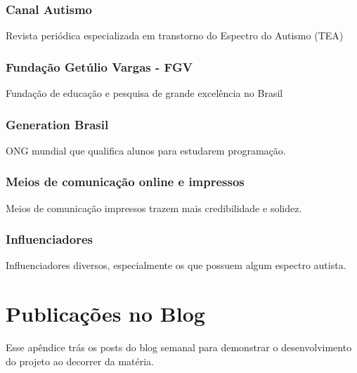 \documentclass[
    12pt,               %
    openright,          %
    oneside,
    a4paper,            %
    paginasA3,  %
    BIBLATEX,           %
    REFINDENT,          %
    MODELO,             %
    TODO,               %
    english,            %
    brazil              %
    ]{ifsp-spo-inf-ctds} %
\providecommand{\DIFaddbegin}{} %
\providecommand{\DIFaddend}{} %
\begin{document}
\begin{apendicesenv}
\subsection{Canal Autismo}
Revista periódica especializada em transtorno do Espectro do Autismo (TEA)

\subsection{Fundação Getúlio Vargas - FGV}
Fundação de educação e pesquisa de grande excelência no Brasil

\subsection{Generation Brasil}
ONG mundial que qualifica alunos para estudarem programação.

\subsection{Meios de comunicação online e impressos}
Meios de comunicação impressos trazem mais credibilidade e solidez.

\subsection{Influenciadores}
Influenciadores diversos, especialmente os que possuem algum espectro autista. 

%


\chapter{Publicações no Blog}

Esse apêndice trás os posts do blog semanal para demonstrar o desenvolvimento do projeto ao decorrer da matéria. 




\end{apendicesenv}
\DIFaddbegin 







\DIFaddend 

\end{document}
